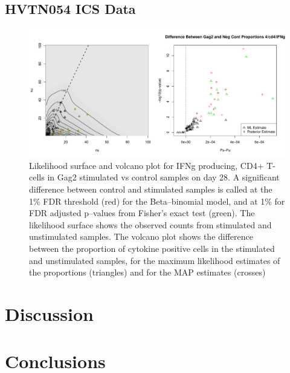 \documentclass[11pt]{article}
\begin{document}
\subsection*{HVTN054 ICS Data}
\begin{figure}[htbp] %
   \centering
   \includegraphics[width=6in]{Figures/HVTN054LikelihoodAndVolcanoplots} 
   \caption{Likelihood surface and volcano plot for IFNg producing, CD4+ T-cells in Gag2 stimulated vs control samples on day 28. A significant difference between control and stimulated samples is called at the 1\% FDR threshold (red) for the Beta--binomial model, and at 1\% for FDR adjusted p--values from Fisher's exact test (green). The likelihood surface shows the observed counts from stimulated and unstimulated samples. The volcano plot shows the difference between the proportion of cytokine positive cells in the stimulated and unstimulated samples, for the maximum likelihood estimates of the proportions (triangles) and for the MAP estimates (crosses)}
   \label{fig:simulations}
\end{figure}

\section*{Discussion}

\section*{Conclusions}
\end{document}
